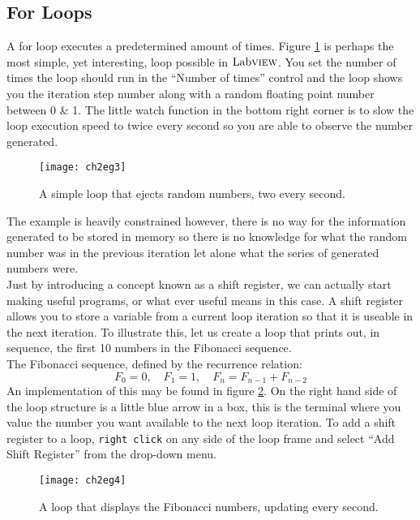\subsection{For Loops}
A for loop executes a predetermined amount of times. Figure \ref{ch2eg3} is perhaps the most simple, yet interesting, loop possible in $\text{Lab}\textsc{view}$. You set the number of times the loop should run in the ``Number of times'' control and the loop shows you the iteration step number along with a random floating point number between 0 \& 1. The little watch function in the bottom right corner is to slow the loop execution speed to twice every second so you are able to observe the number generated.\\
\begin{figure}
	\centering
	\texttt{[image: ch2eg3]}
	\caption{A simple loop that ejects random numbers, two every second.}
	\label{ch2eg3}
\end{figure}

The example is heavily constrained however, there is no way for the information generated to be stored in memory so there is no knowledge for what the random number was in the previous iteration let alone what the series of generated numbers were.\\

Just by introducing a concept known as a shift register, we can actually start making useful programs, or what ever useful means in this case. A shift register allows you to store a variable from a current loop iteration so that it is useable in the next iteration. To illustrate this, let us create a loop that prints out, in sequence, the first 10 numbers in the Fibonacci sequence.\\

The Fibonacci sequence, defined by the recurrence relation:
\begin{equation*}
	F_0=0,\quad F_1=1,\quad F_n= F_{n-1} + F_{n-2}
\end{equation*}
An implementation of this may be found in figure \ref{ch2eg4}. On the right hand side of the loop structure is a little blue arrow in a box, this is the terminal where you value the number you want available to the next loop iteration. To add a shift register to a loop, \texttt{right click} on any side of the loop frame and select ``Add Shift Register'' from the drop-down menu.\\
\begin{figure}
	\centering
	\texttt{[image: ch2eg4]}
	\caption{A loop that displays the Fibonacci numbers, updating every second.}
	\label{ch2eg4}
\end{figure}

